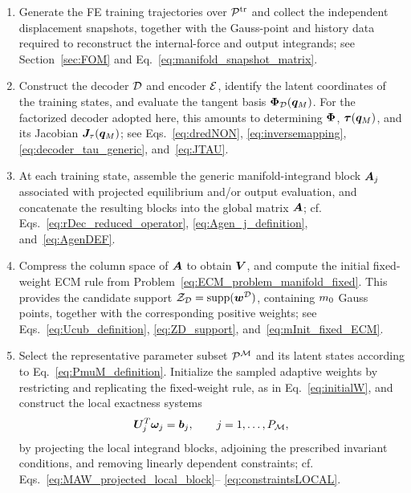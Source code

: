 \documentclass[preprint,10pt]{elsarticle}  %
\begin{document}
\begin{BOX}
\caption{Offline construction of a MAW--ECM rule.}
\label{box:MAW_ECM_summary}

\footnotesize

\begin{enumerate}
\setlength{\itemsep}{2pt}
\setlength{\parsep}{0pt}

\item Generate the FE training trajectories over \(\mathcal{P}^{\textrm{tr}}\) and
collect the independent displacement snapshots, together with the
Gauss-point and history data required to reconstruct the internal-force
and output integrands; see
Section~\ref{sec:FOM}  and
Eq.~\eqref{eq:manifold_snapshot_matrix}.

\item Construct the decoder \(\mathcal{\boldsymbol{D}}\) and encoder \(\mathcal{\boldsymbol{E}}\), identify
the latent coordinates of the training states, and evaluate the tangent
basis \(\bm{\Phi}_{\mathcal{D}}(\bm{q}_M)\). For the factorized decoder adopted here, this
amounts to determining \(\bm{\Phi}\), \(\bm{\tau}(\bm{q}_M)\), and its Jacobian
\(\bm{J}_{\tau}(\bm{q}_M)\); see
Eqs.~\eqref{eq:dredNON}, \eqref{eq:inversemapping},
\eqref{eq:decoder_tau_generic}, and~\eqref{eq:JTAU}.

\item At each training state, assemble the generic manifold-integrand
block \(\bm{A}_j\) associated with projected equilibrium and/or output
evaluation, and concatenate the resulting blocks into the
global matrix \(\bm{A}\); cf.
Eqs.~\eqref{eq:rDec_reduced_operator},
\eqref{eq:Agen_j_definition}, and~\eqref{eq:AgenDEF}.

\item Compress the column space of \(\bm{A}\) to obtain \(\bm{V}\), and
compute the initial fixed-weight ECM rule from
Problem~\eqref{eq:ECM_problem_manifold_fixed}. This provides the
candidate support
\(\mathcal{Z}_{\mathcal{D}}=\operatorname{supp}(\bm{w}^{\mathcal{D}})\), containing \(m_0\) Gauss points, together with
the corresponding positive weights; see
Eqs.~\eqref{eq:Ucub_definition}, \eqref{eq:ZD_support},
and~\eqref{eq:mInit_fixed_ECM}.

\item Select the representative parameter subset \(\mathcal{P}^{\mathcal{M}}\) and its
latent states according to Eq.~\eqref{eq:PmuM_definition}. Initialize
the sampled adaptive weights by restricting and replicating the
fixed-weight rule, as in Eq.~\eqref{eq:initialW}, and construct the
local exactness systems
\[
\bm{U}_{j}^{T}\bm{\omega}_{j}=\bm{b}_{j},
\qquad j=1,\ldots,P_{\mathcal{M}},
\]
by projecting the local integrand blocks, adjoining the prescribed
invariant conditions, and removing linearly dependent constraints;
cf. Eqs.~\eqref{eq:MAW_projected_local_block}--%
\eqref{eq:constraintsLOCAL}.


\end{enumerate}
\end{BOX}
\end{document}
